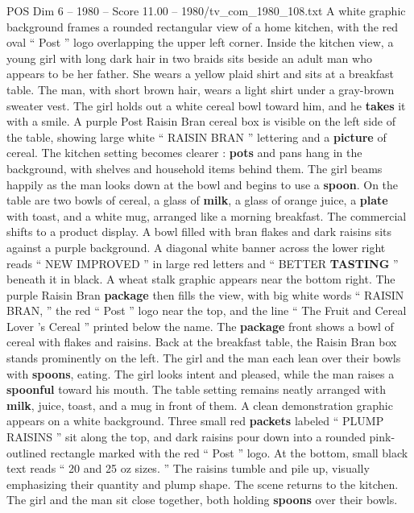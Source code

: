 \begin{textsample}{POS Dim 6 – 1980 – Score 11.00 – 1980/tv\_com\_1980\_108.txt}  \label{ex:f6_pos_036}
A white graphic background frames a rounded rectangular view of a home kitchen, with the red oval “ Post ” logo overlapping the upper left corner.
Inside the kitchen view, a young girl with long dark hair in two braids sits beside an adult man who appears to be her father.
She wears a yellow plaid shirt and sits at a breakfast table.
The man, with short brown hair, wears a light shirt under a gray-brown sweater vest.
The girl holds out a white cereal bowl toward him, and he \textbf{takes} it with a smile.
A purple Post Raisin Bran cereal box is visible on the left side of the table, showing large white “ RAISIN BRAN ” lettering and a \textbf{picture} of cereal.
The kitchen setting becomes clearer : \textbf{pots} and pans hang in the background, with shelves and household items behind them.
The girl beams happily as the man looks down at the bowl and begins to use a \textbf{spoon}.
On the table are two bowls of cereal, a glass of \textbf{milk}, a glass of orange juice, a \textbf{plate} with toast, and a white mug, arranged like a morning breakfast.
The commercial shifts to a product display.
A bowl filled with bran flakes and dark raisins sits against a purple background.
A diagonal white banner across the lower right reads “ NEW IMPROVED ” in large red letters and “ BETTER \textbf{TASTING} ” beneath it in black.
A wheat stalk graphic appears near the bottom right.
The purple Raisin Bran \textbf{package} then fills the view, with big white words “ RAISIN BRAN, ” the red “ Post ” logo near the top, and the line “ The Fruit and Cereal Lover ’s Cereal ” printed below the name.
The \textbf{package} front shows a bowl of cereal with flakes and raisins.
Back at the breakfast table, the Raisin Bran box stands prominently on the left.
The girl and the man each lean over their bowls with \textbf{spoons}, eating.
The girl looks intent and pleased, while the man raises a \textbf{spoonful} toward his mouth.
The table setting remains neatly arranged with \textbf{milk}, juice, toast, and a mug in front of them.
A clean demonstration graphic appears on a white background.
Three small red \textbf{packets} labeled “ PLUMP RAISINS ” sit along the top, and dark raisins pour down into a rounded pink-outlined rectangle marked with the red “ Post ” logo.
At the bottom, small black text reads “ 20 and 25 oz sizes. ” The raisins tumble and pile up, visually emphasizing their quantity and plump shape.
The scene returns to the kitchen.
The girl and the man sit close together, both holding \textbf{spoons} over their bowls.

\end{textsample}
